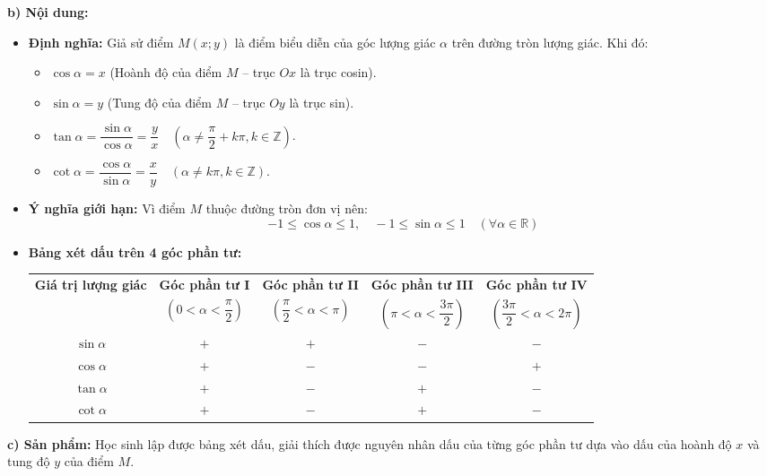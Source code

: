 \documentclass[12pt, a4paper]{article}
\begin{document}
\textbf{b) Nội dung:}
\begin{itemize}[leftmargin=0.6cm]
    \item \textbf{Định nghĩa:} Giả sử điểm $M(x; y)$ là điểm biểu diễn của góc lượng giác $\alpha$ trên đường tròn lượng giác. Khi đó:
    \begin{itemize}[leftmargin=0.5cm]
        \item $\cos\alpha = x$ (Hoành độ của điểm $M$ -- trục $Ox$ là trục cosin).
        \item $\sin\alpha = y$ (Tung độ của điểm $M$ -- trục $Oy$ là trục sin).
        \item $\tan\alpha = \dfrac{\sin\alpha}{\cos\alpha} = \dfrac{y}{x} \quad (\alpha \neq \dfrac{\pi}{2} + k\pi, k \in \mathbb{Z})$.
        \item $\cot\alpha = \dfrac{\cos\alpha}{\sin\alpha} = \dfrac{x}{y} \quad (\alpha \neq k\pi, k \in \mathbb{Z})$.
    \end{itemize}
    \item \textbf{Ý nghĩa giới hạn:} Vì điểm $M$ thuộc đường tròn đơn vị nên:
    $$-1 \le \cos\alpha \le 1, \quad -1 \le \sin\alpha \le 1 \quad (\forall \alpha \in \mathbb{R})$$
    \item \textbf{Bảng xét dấu trên 4 góc phần tư:}
    \begin{center}
    \begin{tabular}{ccccc}
    \toprule
    \textbf{Giá trị lượng giác} & \textbf{Góc phần tư I} & \textbf{Góc phần tư II} & \textbf{Góc phần tư III} & \textbf{Góc phần tư IV} \\
    & $\left(0 < \alpha < \dfrac{\pi}{2}\right)$ & $\left(\dfrac{\pi}{2} < \alpha < \pi\right)$ & $\left(\pi < \alpha < \dfrac{3\pi}{2}\right)$ & $\left(\dfrac{3\pi}{2} < \alpha < 2\pi\right)$ \\
    \midrule
    $\sin\alpha$ & $+$ & $+$ & $-$ & $-$ \\
    $\cos\alpha$ & $+$ & $-$ & $-$ & $+$ \\
    $\tan\alpha$ & $+$ & $-$ & $+$ & $-$ \\
    $\cot\alpha$ & $+$ & $-$ & $+$ & $-$ \\
    \bottomrule
    \end{tabular}
    \end{center}
\end{itemize}

\textbf{c) Sản phẩm:} Học sinh lập được bảng xét dấu, giải thích được nguyên nhân dấu của từng góc phần tư dựa vào dấu của hoành độ $x$ và tung độ $y$ của điểm $M$.
\end{document}
